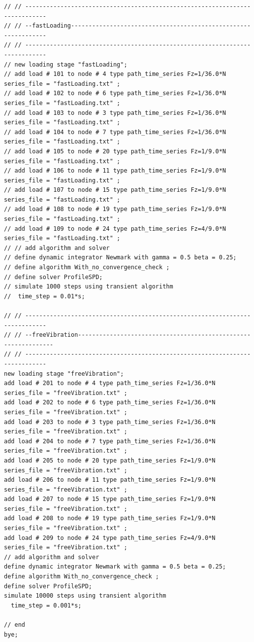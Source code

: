\documentclass[fleqn,11pt]{article}
\begin{document}
\begin{lstlisting}
// // ----------------------------------------------------------------------------
// // --fastLoading---------------------------------------------------------------
// // ----------------------------------------------------------------------------
// new loading stage "fastLoading";
// add load # 101 to node # 4 type path_time_series Fz=1/36.0*N series_file = "fastLoading.txt" ; 
// add load # 102 to node # 6 type path_time_series Fz=1/36.0*N series_file = "fastLoading.txt" ; 
// add load # 103 to node # 3 type path_time_series Fz=1/36.0*N series_file = "fastLoading.txt" ; 
// add load # 104 to node # 7 type path_time_series Fz=1/36.0*N series_file = "fastLoading.txt" ; 
// add load # 105 to node # 20 type path_time_series Fz=1/9.0*N series_file = "fastLoading.txt" ; 
// add load # 106 to node # 11 type path_time_series Fz=1/9.0*N series_file = "fastLoading.txt" ; 
// add load # 107 to node # 15 type path_time_series Fz=1/9.0*N series_file = "fastLoading.txt" ; 
// add load # 108 to node # 19 type path_time_series Fz=1/9.0*N series_file = "fastLoading.txt" ; 
// add load # 109 to node # 24 type path_time_series Fz=4/9.0*N series_file = "fastLoading.txt" ; 
// // add algorithm and solver
// define dynamic integrator Newmark with gamma = 0.5 beta = 0.25;
// define algorithm With_no_convergence_check ;
// define solver ProfileSPD;
// simulate 1000 steps using transient algorithm 
//  time_step = 0.01*s;

// // ----------------------------------------------------------------------------
// // --freeVibration---------------------------------------------------------------
// // ----------------------------------------------------------------------------
new loading stage "freeVibration";
add load # 201 to node # 4 type path_time_series Fz=1/36.0*N series_file = "freeVibration.txt" ; 
add load # 202 to node # 6 type path_time_series Fz=1/36.0*N series_file = "freeVibration.txt" ; 
add load # 203 to node # 3 type path_time_series Fz=1/36.0*N series_file = "freeVibration.txt" ; 
add load # 204 to node # 7 type path_time_series Fz=1/36.0*N series_file = "freeVibration.txt" ; 
add load # 205 to node # 20 type path_time_series Fz=1/9.0*N series_file = "freeVibration.txt" ; 
add load # 206 to node # 11 type path_time_series Fz=1/9.0*N series_file = "freeVibration.txt" ; 
add load # 207 to node # 15 type path_time_series Fz=1/9.0*N series_file = "freeVibration.txt" ; 
add load # 208 to node # 19 type path_time_series Fz=1/9.0*N series_file = "freeVibration.txt" ; 
add load # 209 to node # 24 type path_time_series Fz=4/9.0*N series_file = "freeVibration.txt" ; 
// add algorithm and solver
define dynamic integrator Newmark with gamma = 0.5 beta = 0.25;
define algorithm With_no_convergence_check ;
define solver ProfileSPD;
simulate 10000 steps using transient algorithm 
  time_step = 0.001*s;

// end
bye;
\end{lstlisting}
\end{document}
